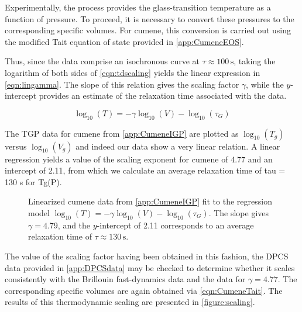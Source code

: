 \noindent Experimentally, the \tgp process provides the glass-transition temperature as a function of pressure. To proceed, it is necessary to convert these pressures to the corresponding specific volumes. For cumene, this conversion is carried out using the modified Tait equation of state provided in \app \ref{app:CumeneEOS}.  

Thus, since the \tgp data comprise an isochronous curve at $\tau \approx 100 \,\si{\second}$, taking the logarithm of both sides of \eqn \ref{eqn:tdscaling} yields the linear expression in \eqn \ref{eqn:lingamma}. The slope of this relation gives the scaling factor $\gamma$, while the $y$-intercept provides an estimate of the relaxation time associated with the \tgp data.  

\begin{equation}\label{eqn:lingamma}
	\log_{10}(T) = -\gamma \log_{10}(V) - \log_{10}(\tau_{G})
\end{equation}

\noindent The TGP data for cumene from \app \ref{app:CumeneIGP} are plotted as $\log_{10}(T_g)$ versus $\log_{10}(V_g)$ and indeed our data show a very linear relation.  A linear regression yields a value of the scaling exponent for cumene of 4.77 and an intercept of 2.11, from which we calculate an average relaxation time of tau = 130 s for Tg(P).

\begin{figure}[!htbp]
	\centering
	\caption{Linearized cumene \tgp data from \app \ref{app:CumeneIGP} fit to the regression model $\log_{10}(T) = -\gamma \log_{10}(V) - \log_{10}(\tau_{G})$. The slope gives $\gamma = 4.79$, and the $y$-intercept of 2.11 corresponds to an average \tgp relaxation time of $\tau \approx 130 \,\si{\second}$.}
	\label{figure:tdscaling}
\end{figure}


The value of the scaling factor having been obtained in this fashion, the DPCS data provided in \app \ref{app:DPCSdata} may be checked to determine whether it scales consistently with the Brillouin fast-dynamics data and the \tgp data for $\gamma = 4.77$. The corresponding specific volumes are again obtained via \eqn \ref{eqn:CumeneTait}. The results of this thermodynamic scaling are presented in \fig  \ref{figure:scaling}.  


